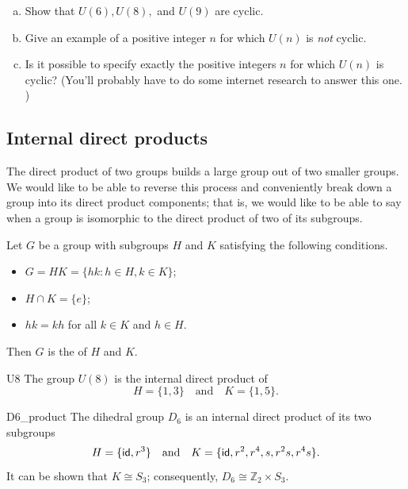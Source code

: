 \begin{exercise}{}
\begin{enumerate}[(a)]
\item
Show that $U(6),U(8), $  and $U(9)$ are cyclic.
\item
Give an example of a positive integer $n$ for which $U(n)$ is \emph{not} cyclic.
\item
Is it possible to specify exactly the positive integers $n$ for which $U(n)$ is cyclic?  (You'll probably have to  do some internet research to answer this one. )
\end{enumerate}
\end{exercise}


\subsection{Internal direct products}
 

The  direct product of two groups builds a large group out of
two smaller groups.   We would like to be able to reverse this process
and conveniently break down a group into its direct product
components; that is, we would like to be able to say when a group is
isomorphic to the direct product of two of its subgroups.
 
\begin{defn}
Let $G$ be a group with subgroups $H$ and $K$ satisfying the following
conditions.
\begin{itemize}
 
\item
$G = HK = \{ hk : h \in H, k \in K  \}$;
 
\item
$H \cap K = \{ e \}$;
 
\item
$hk = kh$ for all $k \in K$ and $h \in H$.
 
\end{itemize}
Then $G$ is the  of $H$ and $K$.
\end{defn}
 
\begin{example}{U8}
The group $U(8)$ is the internal direct product of
\[
H  = \{1, 3 \} \quad \text{and} \quad K  = \{1, 5 \}.
\]
\end{example}

 
\begin{example}{D6_product}
The dihedral group $D_6$ is an internal direct product of its two
subgroups 
\[
H  = \{{\sf{i}d}, r^3  \} \quad \textrm{and} \quad
K  = \{{\sf{i}d}, r^2, r^4, s, r^2s, r^4 s   \}.
\]
It can  be shown that $K \cong S_3$; consequently, $D_6 \cong
{\mathbb Z}_2 \times S_3$. 
\end{example}

